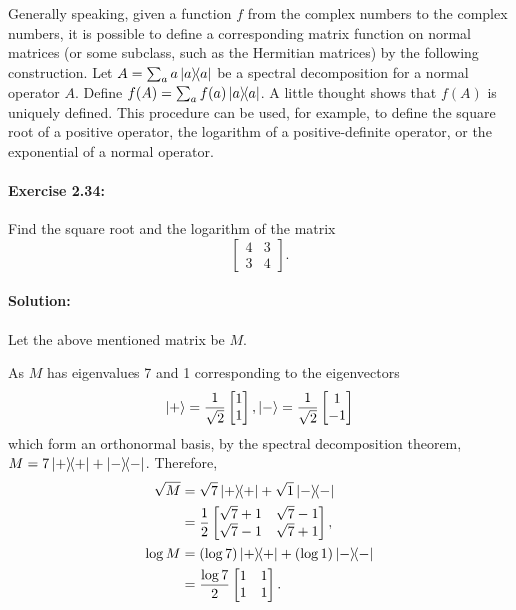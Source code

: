 Generally speaking, given a function $f$ from the complex numbers to the
complex numbers, it is possible to define a corresponding matrix function on
normal matrices (or some subclass, such as the Hermitian matrices) by the
following construction. Let $A = \sum_a a\ketbra{a}{a}$ be a spectral
decomposition for a normal operator $A$. Define $f(A) = \sum_a f(a)
\ketbra{a}{a}$. A little thought shows that $f(A)$ is uniquely defined. This
procedure can be used, for example, to define the square root of a positive
operator, the logarithm of a positive-definite operator, or the exponential
of a normal operator.

\paragraph{\cite{mikeandike} Exercise 2.34:} Find the square root and the
logarithm of the matrix \begin{equation*}
  \begin{bmatrix}
    4 & 3 \\
    3 & 4
  \end{bmatrix}.
\end{equation*}

\paragraph{Solution:} Let the above mentioned matrix be $M$.

As $M$ has eigenvalues 7 and 1 corresponding to the eigenvectors
\begin{equation*}
  \ket{+} = \frac{1}{\sqrt{2}}\begin{bmatrix}1 \\ 1\end{bmatrix},
  \ket{-} = \frac{1}{\sqrt{2}}\begin{bmatrix}1 \\ -1\end{bmatrix}
\end{equation*} which form an orthonormal basis, by the spectral decomposition
theorem, $M = 7\ketbra{+}{+} + \ketbra{-}{-}$. Therefore, \begin{align*}
  \sqrt{M} &= \sqrt{7}\ketbra{+}{+} + \sqrt{1}\ketbra{-}{-} \\
    &= \frac{1}{2}\begin{bmatrix}
      \sqrt{7} + 1 & \sqrt{7} - 1 \\
      \sqrt{7} - 1 & \sqrt{7} + 1
    \end{bmatrix}, \\
  \log{M} &= (\log{7})\ketbra{+}{+} + (\log{1})\ketbra{-}{-} \\
    &= \frac{\log{7}}{2}\begin{bmatrix}
      1 & 1 \\
      1 & 1
    \end{bmatrix}.
\end{align*}


